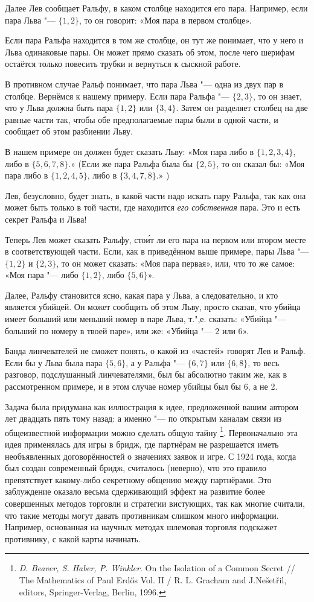 \documentclass[twoside]{book}
\begin{document}
Далее Лев сообщает Ральфу, в каком столбце находится его пара.
Например, если пара Льва "--- $\{1,2\}$, то он говорит: «Моя пара в первом столбце». 

Если пара Ральфа находится в том же столбце, он тут же понимает, что у него и Льва одинаковые пары.
Он может прямо сказать об этом, после чего шерифам остаётся только повесить трубки и вернуться к сыскной работе.

В противном случае Ральф понимает, что пара Льва "--- одна из двух пар в столбце.
Вернёмся к нашему примеру.
Если пара Ральфа "--- $\{2,3\}$, то он знает, что у Льва должна быть пара $\{1,2\}$ или $\{3,4\}$.
Затем он разделяет столбец на две равные части так, чтобы обе предполагаемые пары были в одной части, и сообщает об этом разбиении Льву.

В нашем примере он должен будет сказать Льву: «Моя пара либо в $\{1,2,3,4\}$, либо в $\{5,6,7,8\}$.» (Если же пара Ральфа была бы $\{2,5\}$, то он сказал бы: «Моя пара либо в $\{1,2,4,5\}$, либо в $\{3,4,7,8\}$.» )

Лев, безусловно, будет знать, в какой части надо искать пару Ральфа, так как она может быть только в той части, где находится \emph{его собственная} пара.
Это и есть секрет Ральфа и Льва!

Теперь Лев может сказать Ральфу, сто\'{и}т ли его пара на первом или втором месте в соответствующей части.
Если, как в приведённом выше примере, пары Льва "--- $\{1,2\}$ и $\{2,3\}$, то он может сказать: «Моя пара первая», или, что то же самое: «Моя пара "--- либо $\{1,2\}$, либо $\{5,6\}$».

Далее, Ральфу становится ясно, какая пара у Льва, а следовательно, и кто является убийцей.
Он может сообщить об этом Льву, просто сказав, что убийца  имеет больший или меньший номер в паре Льва, т.",е. сказать: «Убийца "--- больший по номеру в твоей паре», или же: «Убийца "--- 2 или 6».

Банда линчевателей не сможет понять, о какой из «частей» говорят Лев и Ральф.
Если бы у Льва была пара $\{5,6\}$, а у Ральфа "--- $\{6,7\}$ или $\{6,8\}$, то весь разговор, подслушанный линчевателями, был бы абсолютно таким же, как в рассмотренном примере, и в этом случае номер убийцы был бы 6, а не 2.
\heart
 
Задача была придумана как иллюстрация к идее, предложенной вашим автором лет двадцать пять тому назад:
а именно "--- по открытым каналам связи из общеизвестной информации можно сделать общую тайну%
\footnote{\emph{D. Beaver, S. Haber, P. Winkler}. On the Isolation of a Common Secret /\!/ {The Mathematics of Paul Erd\H{o}s} Vol. II / R. L. Gracham and J.Ne\v{s}et\v{r}il, editors, Springer-Verlag, Berlin, 1996.}.
Первоначально эта идея применялась для игры в бридж, где партнёрам не разрешается иметь необъявленных договорённостей о значениях заявок и игре.
С 1924 года, когда был создан современный бридж, считалось (неверно), что это правило препятствует какому-либо секретному общению между партнёрами.
Это заблуждение оказало весьма сдерживающий эффект на развитие более совершенных методов торговли и стратегии вистующих, так как многие считали, что такие методы могут давать противникам слишком много информации.
Например, основанная на научных методах шлемовая торговля подскажет противнику, с какой карты начинать.
\end{document}
